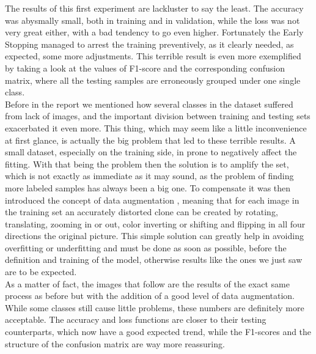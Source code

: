\documentclass[12pt,a4paper]{report}
\begin{document}
The results of this first experiment are lackluster to say the least. The accuracy was abysmally small, both in training and in validation, while the loss was not very great either, with a bad tendency to go even higher. Fortunately the Early Stopping managed to arrest the training preventively, as it clearly needed, as expected, some more adjustments. This terrible result is even more exemplified by taking a look at the values of F1-score and the corresponding confusion matrix, where all the testing samples are erroneously grouped under one single class. \\
Before in the report we mentioned how several classes in the dataset suffered from lack of images, and the important division between training and testing sets exacerbated it even more. This thing, which may seem like a little inconvenience at first glance, is actually the big problem that led to these terrible results. A small dataset, especially on the training side, in prone to negatively affect the fitting. With that being the problem then the solution is to amplify the set, which is not exactly as immediate as it may sound, as the problem of finding more labeled samples has always been a big one. To compensate it was then introduced the concept of data augmentation \cite{data_augmentation}, meaning that for each image in the training set an accurately distorted clone can be created by rotating, translating, zooming in or out, color inverting or shifting and
flipping in all four directions the original picture. This simple solution can greatly help in avoiding overfitting or underfitting and must be done as soon as possible, before the definition and training of the model, otherwise results like the ones we just saw are to be expected. \\
As a matter of fact, the images that follow are the results of the exact same process as before but with the addition of a good level of data augmentation. While some classes still cause little problems, these numbers are definitely more acceptable. The accuracy and loss functions are closer to their testing counterparts, which now have a good expected trend, while the F1-scores and the structure of the confusion matrix are way more reassuring.
\end{document}

